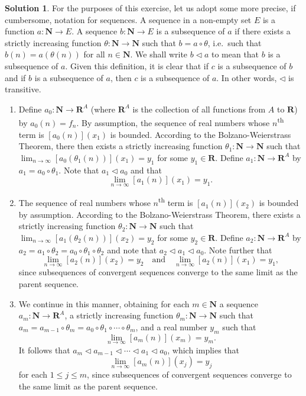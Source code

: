 \documentclass[12pt]{article}
\theoremstyle{definition}
\theoremstyle{exercise}
\theoremstyle{solution}
\newtheorem*{solution}{Solution}
\newcommand{\ts}{\textsuperscript}
\newcommand{\quand}{\quad \text{and} \quad}
\newcommand{\N}{\mathbf{N}}
\newcommand{\R}{\mathbf{R}}
\begin{document}
\begin{solution}
    For the purposes of this exercise, let us adopt some more precise, if cumbersome, notation for sequences. A sequence in a non-empty set \( E \) is a function \( a : \N \to E \). A sequence \( b : \N \to E \) is a subsequence of \( a \) if there exists a strictly increasing function \( \theta : \N \to \N \) such that \( b = a \circ \theta \), i.e.\ such that \( b(n) = a(\theta(n)) \) for all \( n \in \N \). We shall write \( b \triangleleft a \) to mean that \( b \) is a subsequence of \( a \). Given this definition, it is clear that if \( c \) is a subsequence of \( b \) and if \( b \) is a subsequence of \( a \), then \( c \) is a subsequence of \( a \). In other words, \( \triangleleft \) is transitive.
    \begin{enumerate}
        \item Define \( a_0 : \N \to \R^A \) (where \( \R^A \) is the collection of all functions from \( A \) to \( \R \)) by \( a_0(n) = f_n \). By assumption, the sequence of real numbers whose \( n \)\ts{th} term is \( [a_0(n)](x_1) \) is bounded. According to the Bolzano-Weierstrass Theorem, there then exists a strictly increasing function \( \theta_1 : \N \to \N \) such that \( \lim_{n \to \infty} [a_0(\theta_1(n))](x_1) = y_1 \) for some \( y_1 \in \R \). Define \( a_1 : \N \to \R^A \) by \( a_1 = a_0 \circ \theta_1 \). Note that \( a_1 \triangleleft a_0 \) and that
        \[
            \lim_{n \to \infty} [a_1(n)](x_1) = y_1.
        \]

        \item The sequence of real numbers whose \( n \)\ts{th} term is \( [a_1(n)](x_2) \) is bounded by assumption. According to the Bolzano-Weierstrass Theorem, there exists a strictly increasing function \( \theta_2 : \N \to \N \) such that \( \lim_{n \to \infty} [a_1(\theta_2(n))](x_2) = y_2 \) for some \( y_2 \in \R \). Define \( a_2 : \N \to \R^A \) by \( a_2 = a_1 \circ \theta_2 = a_0 \circ \theta_1 \circ \theta_2 \) and note that \( a_2 \triangleleft a_1 \triangleleft a_0 \). Note further that
        \[
            \lim_{n \to \infty} [a_2(n)](x_2) = y_2 \quand \lim_{n \to \infty} [a_2(n)](x_1) = y_1,
        \]
        since subsequences of convergent sequences converge to the same limit as the parent sequence.

        \item We continue in this manner, obtaining for each \( m \in \N \) a sequence \( a_m : \N \to \R^A \), a strictly increasing function \( \theta_m : \N \to \N \) such that \( a_m = a_{m-1} \circ \theta_m = a_0 \circ \theta_1 \circ \cdots \circ \theta_m \), and a real number \( y_m \) such that
        \[
            \lim_{n \to \infty} [a_m(n)](x_m) = y_m.    
        \]
        It follows that \( a_m \triangleleft a_{m-1} \triangleleft \cdots \triangleleft a_1 \triangleleft a_0 \), which implies that
        \[
            \lim_{n \to \infty} [a_m(n)](x_j) = y_j
        \]
        for each \( 1 \leq j \leq m \), since subsequences of convergent sequences converge to the same limit as the parent sequence.
        

\end{enumerate}
\end{solution}
\end{document}

